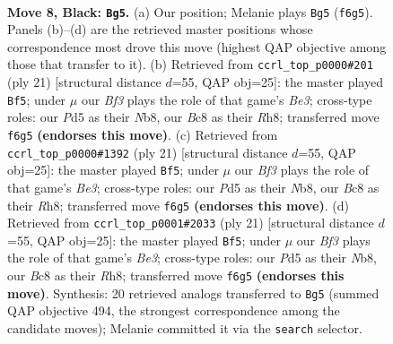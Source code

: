 \documentclass[11pt]{article}
\begin{document}
\begin{figure}[p]\centering
\begin{subfigure}{0.46\textwidth}\centering
\resizebox{\linewidth}{!}{%
\newchessgame
\chessboard[
  setfen={rnbqk2r/pp3ppp/2p2b2/3p4/3P2P1/2N1P3/PP3P1P/R2QKBNR b KQkq - 0 8},
  showmover=false,
  pgfstyle=straightmove, color=movearrow, markmove={f6-g5}
]}
\caption{}
\end{subfigure}\hfill
\begin{subfigure}{0.46\textwidth}\centering
\resizebox{\linewidth}{!}{%
\newchessgame
\chessboard[
  setfen={rn1qk2r/1p2bpp1/p2pb3/3Pp2p/8/1N2BP2/PPPQ2PP/R3KB1R b KQkq - 0 11},
  showmover=false,
  pgfstyle=straightmove, color=movearrow, markmove={e6-f5}
]}
\caption{}
\end{subfigure}
\\[4pt]
\begin{subfigure}{0.46\textwidth}\centering
\resizebox{\linewidth}{!}{%
\newchessgame
\chessboard[
  setfen={rn1qk2r/1p2bpp1/p2pb3/3Pp2p/8/1N2BP2/PPPQ2PP/R3KB1R b KQkq - 0 11},
  showmover=false,
  pgfstyle=straightmove, color=movearrow, markmove={e6-f5}
]}
\caption{}
\end{subfigure}\hfill
\begin{subfigure}{0.46\textwidth}\centering
\resizebox{\linewidth}{!}{%
\newchessgame
\chessboard[
  setfen={rn1qk2r/1p2bpp1/p2pb3/3Pp2p/8/1N2BP2/PPPQ2PP/R3KB1R b KQkq - 0 11},
  showmover=false,
  pgfstyle=straightmove, color=movearrow, markmove={e6-f5}
]}
\caption{}
\end{subfigure}
\caption{\textbf{Move 8, Black: \texttt{Bg5}.} (a) Our position; Melanie plays \texttt{Bg5} (\texttt{f6g5}). Panels (b)--(d) are the retrieved master positions whose correspondence most drove this move (highest QAP objective among those that transfer to it). (b) Retrieved from \texttt{ccrl\_top\_p0000\#201} (ply 21) [structural distance $d$=55, QAP obj=25]: the master played \texttt{Bf5}; under $\mu$ our \emph{Bf3} plays the role of that game's \emph{Be3}; cross-type roles: our \emph{P}d5 as their \emph{N}b8, our \emph{B}c8 as their \emph{R}h8; transferred move \texttt{f6g5} \textbf{(endorses this move)}. (c) Retrieved from \texttt{ccrl\_top\_p0000\#1392} (ply 21) [structural distance $d$=55, QAP obj=25]: the master played \texttt{Bf5}; under $\mu$ our \emph{Bf3} plays the role of that game's \emph{Be3}; cross-type roles: our \emph{P}d5 as their \emph{N}b8, our \emph{B}c8 as their \emph{R}h8; transferred move \texttt{f6g5} \textbf{(endorses this move)}. (d) Retrieved from \texttt{ccrl\_top\_p0001\#2033} (ply 21) [structural distance $d$=55, QAP obj=25]: the master played \texttt{Bf5}; under $\mu$ our \emph{Bf3} plays the role of that game's \emph{Be3}; cross-type roles: our \emph{P}d5 as their \emph{N}b8, our \emph{B}c8 as their \emph{R}h8; transferred move \texttt{f6g5} \textbf{(endorses this move)}. Synthesis: 20 retrieved analogs transferred to \texttt{Bg5} (summed QAP objective 494, the strongest correspondence among the candidate moves); Melanie committed it via the \texttt{search} selector.}
\label{fig:thought-m15}
\end{figure}
\end{document}
